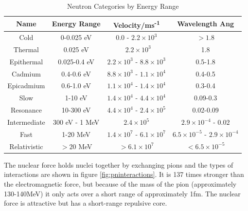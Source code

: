 \begin{table}[h]
\begin{center}
\renewcommand{\arraystretch}{1.2}
\begin{tabular}{c c c c}
\hline\hline
Name & Energy Range & Velocity/ms\textsuperscript{-1} & Wavelength Ang \\
\hline\hline
Cold & 0-0.025 eV & 0.0 - $2.2 \times 10^{3}$ &  $> 1.8$  \\
Thermal & 0.025 eV & ~$2.2 \times 10^{3}$ &  1.8  \\
Epithermal & 0.025-0.4 eV & $2.2 \times 10^{3}$ - $8.8 \times 10^{3}$ &  0.5-1.8 \\
Cadmium & 0.4-0.6 eV & $8.8 \times 10^{3}$ - $1.1 \times 10^4$ & 0.4-0.5  \\
Epicadmium & 0.6-1.0 eV & $1.1 \times 10^4$ - $1.4 \times 10^4$ & 0.3-0.4\\
Slow & 1-10 eV & $1.4 \times 10^4$ - $4.4 \times 10^4$   & 0.09-0.3\\
Resonance & 10-300 eV & $4.4 \times 10^4$ - $2.4 \times 10^5$ & 0.02-0.09\\
Intermediate & 300 eV - 1 MeV &  $2.4 \times 10^5$ & $2.9 \times 10^{-4}$ - $0.02$\\
Fast & 1-20 MeV & $1.4 \times 10^7$ - $6.1 \times 10^7$ & $6.5 \times 10^{-5}$ - $2.9 \times 10^{-4}$ \\
Relativistic & $>20$ MeV & $>6.1 \times 10^{7}$ & $< 6.5 \times 10^{-5}$\\
\hline\hline
\end{tabular}
\end{center}
\caption{Neutron Categories by Energy Range \cite{njcarron}}
\label{table:neutronenergies}
\end{table}

The nuclear force holds nuclei together by exchanging pions and the types of interactions are shown in figure \ref{fig:pninteractions}.  It is 137 times stronger than the electromagnetic force, but because of the mass of the pion (approximately 130-140MeV) it only acts over a short range of approximately 1fm.  The nuclear force is attractive but has a short-range repulsive core.

